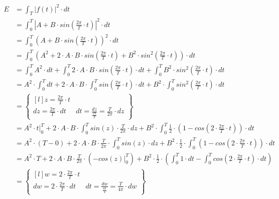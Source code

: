 \begin{align*}
E&=\int_{T}^{}\left|f(t)\right|^2 \cdot dt\\
 &=\int_{0}^{T}\left|A + B \cdot sin\left(\frac{2\pi}{T}\cdot t \right) \right|^2 \cdot dt\\ 
 &=\int_{0}^{T}\left(A + B \cdot sin\left(\frac{2\pi}{T}\cdot t \right) \right)^2 \cdot dt\\ 
 &=\int_{0}^{T}\left(A^2 + 2\cdot A \cdot B \cdot sin\left(\frac{2\pi}{T}\cdot t \right) + B^2 \cdot sin^2\left(\frac{2\pi}{T}\cdot t \right) \right) \cdot dt\\
 &=\int_{0}^{T}A^2 \cdot dt + \int_{0}^{T} 2\cdot A \cdot B \cdot sin\left(\frac{2\pi}{T}\cdot t \right) \cdot dt + \int_{0}^{T} B^2 \cdot sin^2\left(\frac{2\pi}{T}\cdot t \right)  \cdot dt\\
 &=A^2 \cdot \int_{0}^{T} dt + 2\cdot A \cdot B \cdot \int_{0}^{T} sin\left(\frac{2\pi}{T}\cdot t \right) \cdot dt + B^2 \cdot \int_{0}^{T}  sin^2\left(\frac{2\pi}{T}\cdot t \right)  \cdot dt\\
 &=\begin{Bmatrix*}[l]
 z=\frac{2\pi}{T} \cdot t\\
 dz = \frac{2\pi}{T} \cdot dt & dt = \frac{dz}{\frac{2\pi}{T}} =\frac{T}{2\pi} \cdot dz 
 \end{Bmatrix*}\\
 &=A^2 \cdot \left. t \right|_{0}^{T} + 2\cdot A \cdot B \cdot \int_{0}^{T} sin\left(z \right) \cdot \frac{T}{2\pi} \cdot dz + B^2 \cdot \int_{0}^{T} \frac{1}{2} \cdot \left(1 - cos\left(2 \cdot \frac{2\pi}{T}\cdot t \right) \right)  \cdot dt\\
 &=A^2 \cdot \left( T - 0 \right) + 2\cdot A \cdot B \cdot \frac{T}{2\pi} \cdot \int_{0}^{T} sin\left(z \right) \cdot dz + B^2 \cdot \frac{1}{2} \cdot \int_{0}^{T} \left(1 - cos\left(2 \cdot \frac{2\pi}{T}\cdot t \right) \right)  \cdot dt\\
 &=A^2 \cdot T + 2\cdot A \cdot B \cdot \frac{T}{2\pi} \cdot \left( \left.-cos\left(z \right)\right|_{0}^{T}  \right) + B^2 \cdot \frac{1}{2} \cdot \left( \int_{0}^{T} 1 \cdot dt - \int_{0}^{T} cos\left(2 \cdot \frac{2\pi}{T}\cdot t \right)  \cdot dt \right)\\
 &=\begin{Bmatrix*}[l]
 w=2\cdot \frac{2\pi}{T} \cdot t\\
 dw = 2\cdot \frac{2\pi}{T} \cdot dt & dt = \frac{dw}{\frac{4\pi}{T}} =\frac{T}{4\pi} \cdot dw 

\end{Bmatrix*}
\end{align*}
